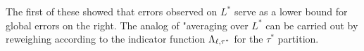 
The first of these showed that errors observed on $L^*$ serve as a lower bound for global errors on the right. The analog of "averaging over $L^*$ can be carried out by reweighing according to the indicator function $\Lambda_{{ \ell },\tau^*}$ for the $\tau^*$ partition.
	
